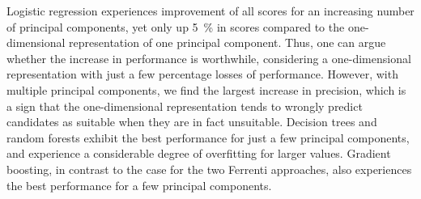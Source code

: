 \documentclass[superscriptaddress,unsortedaddress,
 amsmath,amssymb,
 aps,
]{revtex4-2}
\begin{document}
Logistic regression experiences improvement of all scores for an increasing number of principal components, yet only up \SI{5}{\percent} in scores compared to the one-dimensional representation of one principal component. Thus, one can argue whether the increase in performance is worthwhile, considering a one-dimensional representation with just a few percentage losses of performance. However, with multiple principal components, we find the largest increase in precision, which is a sign that the one-dimensional representation tends to wrongly predict candidates as suitable when they are in fact unsuitable. Decision trees and random forests exhibit the best performance for just a few principal components, and experience a considerable degree of overfitting for larger values. Gradient boosting, in contrast to the case for the two Ferrenti approaches, also experiences the best performance for a few principal components.

\begin{table}[t]
\centering
\caption{ Optimal number of principal components and the respective scores (standard deviation) for each of the four ML methods logistic regression (LOG), decision trees (DT), random forests (RF) and gradient boosting (GB) in the empirical approach, as visualized by the dash-dotted line in Fig.~\ref{fig:03-pca}.}
\label{tab:03-pca}
\noindent{}
\end{table}
\end{document}
